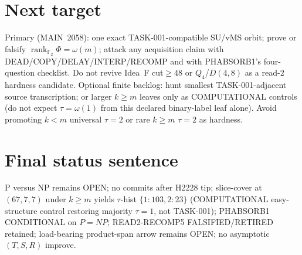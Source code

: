 \documentclass[11pt]{article}
\begin{document}
\section*{Next target}
Primary (MAIN~2058): one exact TASK-001-compatible SU/vMS orbit; prove or falsify
$\operatorname{rank}_{\mathbb F_2}\Phi=\omega(m)$; attack any acquisition claim with
DEAD/COPY/DELAY/INTERP/RECOMP and with PHABSORB1's four-question checklist.
Do not revive Idea~F cut$\ge48$ or $Q_4$/$D(4,8)$ as a read-$2$ hardness candidate.
Optional finite backlog: hunt smallest TASK-001-adjacent source transcription;
or larger $k{\ge}m$ leaves only as COMPUTATIONAL controls (do not expect $\tau=\omega(1)$
from this declared binary-label leaf alone).
Avoid promoting $k{<}m$ universal $\tau{=}2$ or rare $k{\ge}m$ $\tau{=}2$ as hardness.

\section*{Final status sentence}
P versus NP remains OPEN; no commits after H2228 tip; slice-cover at $(67,7,7)$
under $k{\ge}m$ yields $\tau$-hist $\{1{:}103,2{:}23\}$ (COMPUTATIONAL easy-structure
control restoring majority $\tau{=}1$, not TASK-001); PHABSORB1 CONDITIONAL on $P=NP$;
READ2-RECOMP5 FALSIFIED/RETIRED retained; load-bearing product-span arrow remains OPEN;
no asymptotic $(T,S,R)$ improve.
\end{document}
